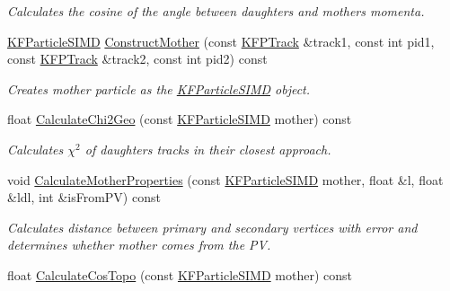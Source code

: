 \begin{DoxyCompactItemize}
\begin{DoxyCompactList}\small\item\em Calculates the cosine of the angle between daughter\textquotesingle{}s and mother\textquotesingle{}s momenta. \end{DoxyCompactList}\item 
\hyperlink{classKFParticleSIMD}{K\+F\+Particle\+S\+I\+MD} \hyperlink{classSimpleFinder_a10ef8ed683c90625963c3185e5399771}{Construct\+Mother} (const \hyperlink{classKFPTrack}{K\+F\+P\+Track} \&track1, const int pid1, const \hyperlink{classKFPTrack}{K\+F\+P\+Track} \&track2, const int pid2) const \hypertarget{classSimpleFinder_a10ef8ed683c90625963c3185e5399771}{}\label{classSimpleFinder_a10ef8ed683c90625963c3185e5399771}

\begin{DoxyCompactList}\small\item\em Creates mother particle as the \hyperlink{classKFParticleSIMD}{K\+F\+Particle\+S\+I\+MD} object. \end{DoxyCompactList}\item 
float \hyperlink{classSimpleFinder_ab174fa409931711f1e2cc650b73922fb}{Calculate\+Chi2\+Geo} (const \hyperlink{classKFParticleSIMD}{K\+F\+Particle\+S\+I\+MD} mother) const \hypertarget{classSimpleFinder_ab174fa409931711f1e2cc650b73922fb}{}\label{classSimpleFinder_ab174fa409931711f1e2cc650b73922fb}

\begin{DoxyCompactList}\small\item\em Calculates $\chi^2$ of daughters\textquotesingle{} tracks in their closest approach. \end{DoxyCompactList}\item 
void \hyperlink{classSimpleFinder_a3cad4e43c94a2a57960ab867eb4207e0}{Calculate\+Mother\+Properties} (const \hyperlink{classKFParticleSIMD}{K\+F\+Particle\+S\+I\+MD} mother, float \&l, float \&ldl, int \&is\+From\+PV) const \hypertarget{classSimpleFinder_a3cad4e43c94a2a57960ab867eb4207e0}{}\label{classSimpleFinder_a3cad4e43c94a2a57960ab867eb4207e0}

\begin{DoxyCompactList}\small\item\em Calculates distance between primary and secondary vertices with error and determines whether mother comes from the PV. \end{DoxyCompactList}\item 
float \hyperlink{classSimpleFinder_a874a6c11539d459f53e86c364c0f2892}{Calculate\+Cos\+Topo} (const \hyperlink{classKFParticleSIMD}{K\+F\+Particle\+S\+I\+MD} mother) const \hypertarget{classSimpleFinder_a874a6c11539d459f53e86c364c0f2892}{}\label{classSimpleFinder_a874a6c11539d459f53e86c364c0f2892}


\end{DoxyCompactItemize}
